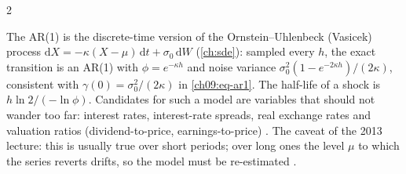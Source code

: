 \begin{paracol}{2}
\begin{finance}\label{ch09:fin-vasicek}
The AR(1) is the discrete-time version of the Ornstein--Uhlenbeck (Vasicek) process
$\mathrm dX=-\kappa(X-\mu)\,\mathrm dt+\sigma_0\,\mathrm dW$ (\cref{ch:sde}): sampled every $h$, the exact
transition is an AR(1) with $\phi=e^{-\kappa h}$ and noise variance $\sigma_0^2(1-e^{-2\kappa h})/(2\kappa)$, consistent with
$\gamma(0)=\sigma_0^2/(2\kappa)$ in \eqref{ch09:eq-ar1}. The half-life of a shock is
$h\ln2/(-\ln\phi)$. Candidates for such a model are variables that should not wander too far: interest
rates, interest-rate spreads, real exchange rates and valuation ratios (dividend-to-price, earnings-to-price)
. The caveat of the 2013 lecture: this is usually true over short
periods; over long ones the level $\mu$ to which the series reverts drifts, so the model must be re-estimated
.
\end{finance}


\end{paracol}
